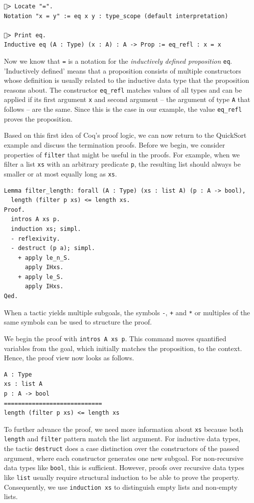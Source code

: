 \documentclass[a4paper, 11pt, fleqn, twoside, abstract=on]{scrreprt}
\newcommand{\cinl}[1]{\texttt{#1}}
\begin{document}
\begin{verbatim}
🐔> Locate "=".
Notation "x = y" := eq x y : type_scope (default interpretation)

🐔> Print eq.
Inductive eq (A : Type) (x : A) : A -> Prop := eq_refl : x = x
\end{verbatim}
\noindent
Now we know that \cinl{=} is a notation for the \textit{inductively defined proposition} \cinl{eq}.
'Inductively defined' means that a proposition consists of multiple constructors whose definition is usually related to the inductive data type that the proposition reasons about.
The constructor \cinl{eq_refl} matches values of all types and can be applied if its first argument \cinl{x} and second argument -- the argument of type \cinl{A} that follows -- are the same.
Since this is the case in our example, the value \cinl{eq_refl} proves the proposition.

Based on this first idea of Coq's proof logic, we can now return to the QuickSort example and discuss the termination proofs.
Before we begin, we consider properties of \cinl{filter} that might be useful in the proofs.
For example, when we filter a list \cinl{xs} with an arbitrary predicate \cinl{p}, the resulting list should always be smaller or at most equally long as \cinl{xs}.

\begin{verbatim}
Lemma filter_length: forall (A : Type) (xs : list A) (p : A -> bool),
  length (filter p xs) <= length xs.
Proof.
  intros A xs p.
  induction xs; simpl.
  - reflexivity.
  - destruct (p a); simpl.
    + apply le_n_S.
      apply IHxs.
    + apply le_S.
      apply IHxs.
Qed.
\end{verbatim}
\noindent
When a tactic yields multiple subgoals, the symbols \cinl{-}, \cinl{+} and \cinl{*} or multiples of the same symbols can be used to structure the proof.

We begin the proof with \cinl{intros A xs p}. 
This command moves quantified variables from the goal, which initially matches the proposition, to the context.
Hence, the proof view now looks as follows.

\begin{verbatim}
A : Type
xs : list A
p : A -> bool
============================
length (filter p xs) <= length xs
\end{verbatim}
\noindent
To further advance the proof, we need more information about \cinl{xs} because both \cinl{length} and \cinl{filter} pattern match the list argument.
For inductive data types, the tactic \cinl{destruct} does a case distinction over the constructors of the passed argument, where each constructor generates one new subgoal.
For non-recursive data types like \cinl{bool}, this is sufficient.
However, proofs over recursive data types like \cinl{list} usually require structural induction to be able to prove the property.
Consequently, we use \cinl{induction xs} to distinguish empty lists and non-empty lists.
\end{document}
